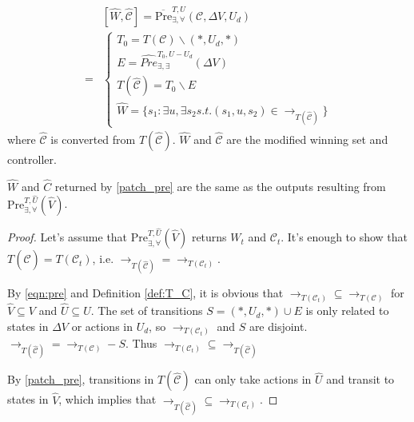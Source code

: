 \begin{align}
&[\widehat{W},\widehat{\mathcal{C}}]=\overline{\text{Pre}}_{\exists,\forall}^{T, U}(\mathcal{C},\Delta V,U_d)\\
=&\begin{cases} 
T_{0} = T(\mathcal{C})\backslash (*,U_d,*)\\
E =  \widehat{Pre}^{T_0,U-U_d}_{\exists,\exists}(\Delta V)\\
T(\widehat{\mathcal{C}}) = T_{0}\backslash E\\
\widehat{W} = \{s_1: \exists u, \exists s_2 s.t. (s_1,u, s_2)\in \rightarrow_{T(\widehat{\mathcal{C}})} \}
\end{cases}\label{patch_pre}
\end{align}
where $ \widehat{\mathcal{C}} $ is converted from $ T(\widehat{\mathcal{C}}) $. $ \widehat{W} $ and $ \widehat{\mathcal{C}} $ are the modified winning set and controller.

\begin{theorem}
	$ \widehat{W} $ and $ \widehat{C} $ returned by \eqref{patch_pre} are the same as the outputs resulting from $ \text{Pre}_{\exists,\forall}^{T,\widehat{U}}(\widehat{V})$.	\label{thm:pre}
\end{theorem}

\begin{proof}
	Let's assume that $ \text{Pre}_{\exists,\forall}^{T,\widehat{U}}(\widehat{V}) $ returns $ W_t $ and $ \mathcal{C}_t $. It's enough to show that $ T(\widehat{\mathcal{C}})= T(\mathcal{C}_t)$, i.e. $ \rightarrow_{T(\widehat{\mathcal{C}})} = \rightarrow_{T(\mathcal{C}_t)} $. 
	
	By \eqref{eqn:pre} and Definition \ref{def:T_C}, it is obvious that $ \rightarrow_{T(\mathcal{C}_t)} \subseteq \rightarrow_{T(\mathcal{C})}$ for $ \widehat{V}\subseteq V $ and $ \widehat{U}\subseteq U $. The set of transitions $ S = (*,U_d,*)\cup E $ is only related to states in $ \Delta V $ or actions in $ U_d $, so $\rightarrow_{T(\mathcal{C}_t)}$ and $ S $ are disjoint. $ \rightarrow_{T(\widehat{\mathcal{C}})}= \rightarrow_{T(\mathcal{C})}-S$. Thus $ \rightarrow_{T(\mathcal{C}_t)}\subseteq \rightarrow_{T(\widehat{\mathcal{C}})}$ 
	
	By \eqref{patch_pre}, transitions in $ T(\widehat{\mathcal{C}}) $ can only take actions in $ \widehat{U} $ and transit to states in $ \widehat{V} $, which implies that $ \rightarrow_{T(\widehat{\mathcal{C}})}\subseteq \rightarrow_{T(\mathcal{C}_t)} $.  
\end{proof}

